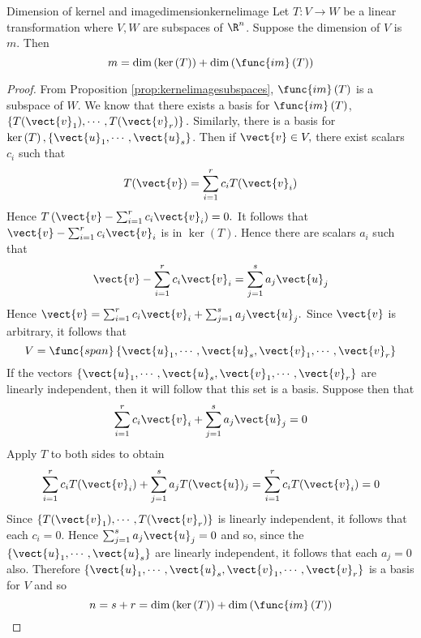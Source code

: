 \begin{theorem}{Dimension of kernel and image}{dimensionkernelimage}
Let $T:V\rightarrow W$ be a linear transformation where $V,W$ are subspaces of $\R^n$. Suppose the dimension of $V$ is $m$. Then 
\[
m=\dim \left( \ker \left( T\right) \right) +\dim \left( \func{im}\left(
T\right) \right) 
\]
\end{theorem}

\begin{proof}
From Proposition \ref{prop:kernelimagesubspaces}, $\func{im}\left( T\right) $ is a subspace of $W.$ We know that there exists a basis for $\func{im}\left( T\right)$, $\left\{ T(\vect{v}
_{1}),\cdots ,T(\vect{v}_{r})\right\} . $ Similarly, there is a basis for $\ker
\left( T\right) ,\left\{ \vect{u}_{1},\cdots ,\vect{u}_{s}\right\} $. Then if $
\vect{v}\in V,$ there exist scalars $c_{i}$ such that 
\begin{equation*}
T(\vect{v})=\sum_{i=1}^{r}c_{i}T(\vect{v}_{i})
\end{equation*}
Hence $T\left( \vect{v}-\sum_{i=1}^{r}c_{i}\vect{v}_{i}\right) =0.$ It follows
that $\vect{v}-\sum_{i=1}^{r}c_{i}\vect{v}_{i}$ is in $\ker \left( T\right) $.
Hence there are scalars $a_{i}$ such that 
\begin{equation*}
\vect{v}-\sum_{i=1}^{r}c_{i}\vect{v}_{i}=\sum_{j=1}^{s}a_{j}\vect{u}_{j}
\end{equation*}
Hence $\vect{v}=\sum_{i=1}^{r}c_{i}\vect{v}_{i}+\sum_{j=1}^{s}a_{j}\vect{u}
_{j}. $ Since $\vect{v}$ is arbitrary, it follows that 
\begin{equation*}
V=\func{span}\left\{ \vect{u}_{1},\cdots ,\vect{u}_{s},\vect{v}_{1},\cdots ,
\vect{v}_{r}\right\}
\end{equation*}
If the vectors $\left\{ \vect{u}_{1},\cdots ,\vect{u}_{s},\vect{v}_{1},\cdots ,
\vect{v}_{r}\right\} $ are linearly independent, then it will follow that
this set is a basis. Suppose then that 
\begin{equation*}
\sum_{i=1}^{r}c_{i}\vect{v}_{i}+\sum_{j=1}^{s}a_{j}\vect{u}_{j}=0
\end{equation*}
Apply $T$ to both sides to obtain 
\begin{equation*}
\sum_{i=1}^{r}c_{i}T(\vect{v}_{i})+\sum_{j=1}^{s}a_{j}T(\vect{u})
_{j}=\sum_{i=1}^{r}c_{i}T(\vect{v}_{i})=0
\end{equation*}
Since $\left\{ T(\vect{v}_{1}),\cdots ,T(\vect{v}_{r})\right\} $ is linearly
independent, it follows that each $c_{i}=0.$ Hence $\sum_{j=1}^{s}a_{j}\vect{u
}_{j}=0$ and so, since the $\left\{ \vect{u}_{1},\cdots ,\vect{u}_{s}\right\} $
are linearly independent, it follows that each $a_{j}=0$ also. Therefore $\left\{ \vect{u}_{1},\cdots ,\vect{u}_{s},\vect{v}_{1},\cdots ,\vect{v}
_{r}\right\} $ is a basis for $V$ and so 
\begin{equation*}
n=s+r=\dim \left( \ker \left( T\right) \right) +\dim \left( \func{im}\left(
T\right) \right) 
\end{equation*}
\end{proof}

